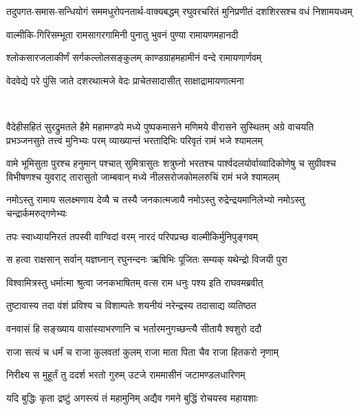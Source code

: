 \twolineshloka
{तदुपगत-समास-सन्धियोगं सममधुरोपनतार्थ-वाक्यबद्धम्}
{रघुवरचरितं मुनिप्रणीतं दशशिरसश्च वधं निशामयध्वम्}

\twolineshloka
{वाल्मीकि-गिरिसम्भूता रामसागरगामिनी}
{पुनातु भुवनं पुण्या रामायणमहानदी}

\twolineshloka
{श्लोकसारजलाकीर्णं सर्गकल्लोलसङ्कुलम्}
{काण्डग्राहमहामीनं वन्दे रामायणार्णवम्}

\twolineshloka
{वेदवेद्ये परे पुंसि जाते दशरथात्मजे}
{वेदः प्राचेतसादासीत् साक्षाद्रामायणात्मना}

\mbox{}\\
\resetShloka
{}

\fourlineindentedshloka
{वैदेहीसहितं सुरद्रुमतले हैमे महामण्डपे}
{मध्ये पुष्पकमासने मणिमये वीरासने सुस्थितम्}
{अग्रे वाचयति प्रभञ्जनसुते तत्त्वं मुनिभ्यः परम्}
{व्याख्यान्तं भरतादिभिः परिवृतं रामं भजे श्यामलम्}

\fourlineindentedshloka
{वामे भूमिसुता पुरश्च हनुमान् पश्चात् सुमित्रासुतः}
{शत्रुघ्नो भरतश्च पार्श्वदलयोर्वाय्वादिकोणेषु च}
{सुग्रीवश्च विभीषणश्च युवराट् तारासुतो जाम्बवान्}
{मध्ये नीलसरोजकोमलरुचिं रामं भजे श्यामलम्}

\twolineshloka
{नमोऽस्तु रामाय सलक्ष्मणाय देव्यै च तस्यै जनकात्मजायै}
{नमोऽस्तु रुद्रेन्द्रयमानिलेभ्यो नमोऽस्तु चन्द्रार्कमरुद्गणेभ्यः}

\clearpage
\resetShloka
{}
\twolineshloka
{तपः स्वाध्यायनिरतं तपस्वी वाग्विदां वरम्}
{नारदं परिपप्रच्छ वाल्मीकिर्मुनिपुङ्गवम्}%

\twolineshloka
{स हत्वा राक्षसान् सर्वान् यज्ञघ्नान् रघुनन्दनः}
{ऋषिभिः पूजितः सम्यक् यथेन्द्रो विजयी पुरा}%

\twolineshloka
{विश्वामित्रस्तु धर्मात्मा श्रुत्वा जनकभाषितम्}
{वत्स राम धनुः पश्य इति राघवमब्रवीत्}%

\twolineshloka
{तुष्टावास्य तदा वंशं  प्रविश्य च विशाम्पतेः}
{शयनीयं नरेन्द्रस्य तदासाद्य व्यतिष्ठत}%

\twolineshloka
{वनवासं हि सङ्ख्याय वासांस्याभरणानि च}
{भर्तारमनुगच्छन्त्यै सीतायै श्वशुरो ददौ}%

\twolineshloka
{राजा सत्यं च धर्मं च  राजा कुलवतां कुलम्}
{राजा माता पिता चैव राजा हितकरो नृणाम्}%

\twolineshloka
{निरीक्ष्य स मुहूर्तं तु ददर्श भरतो गुरुम्}
{उटजे राममासीनं जटामण्डलधारिणम्}%

\twolineshloka
{यदि बुद्धिः कृता द्रष्टुं अगस्त्यं तं महामुनिम्}
{अद्यैव गमने बुद्धिं रोचयस्व महायशाः}%

